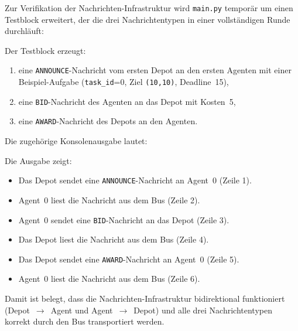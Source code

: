 Zur Verifikation der Nachrichten-Infrastruktur wird \texttt{main.py} temporär um einen Testblock erweitert, der die drei Nachrichtentypen in einer vollständigen Runde durchläuft:



Der Testblock erzeugt:
\begin{enumerate}
    \item eine \texttt{ANNOUNCE}-Nachricht vom ersten Depot an den ersten Agenten mit einer Beispiel-Aufgabe (\texttt{task\_id}=0, Ziel \texttt{(10,10)}, Deadline~15),
    \item eine \texttt{BID}-Nachricht des Agenten an das Depot mit Kosten~5,
    \item eine \texttt{AWARD}-Nachricht des Depots an den Agenten.
\end{enumerate}

Die zugehörige Konsolenausgabe lautet:



Die Ausgabe zeigt:
\begin{itemize}
    \item Das Depot sendet eine \texttt{ANNOUNCE}-Nachricht an Agent~0 (Zeile 1).
    \item Agent~0 liest die Nachricht aus dem Bus (Zeile 2).
    \item Agent~0 sendet eine \texttt{BID}-Nachricht an das Depot (Zeile 3).
    \item Das Depot liest die Nachricht aus dem Bus (Zeile 4).
    \item Das Depot sendet eine \texttt{AWARD}-Nachricht an Agent~0 (Zeile 5).
    \item Agent~0 liest die Nachricht aus dem Bus (Zeile 6).
\end{itemize}

Damit ist belegt, dass die Nachrichten-Infrastruktur bidirektional funktioniert (Depot~\(\to\)~Agent und Agent~\(\to\)~Depot) und alle drei Nachrichtentypen korrekt durch den Bus transportiert werden.

